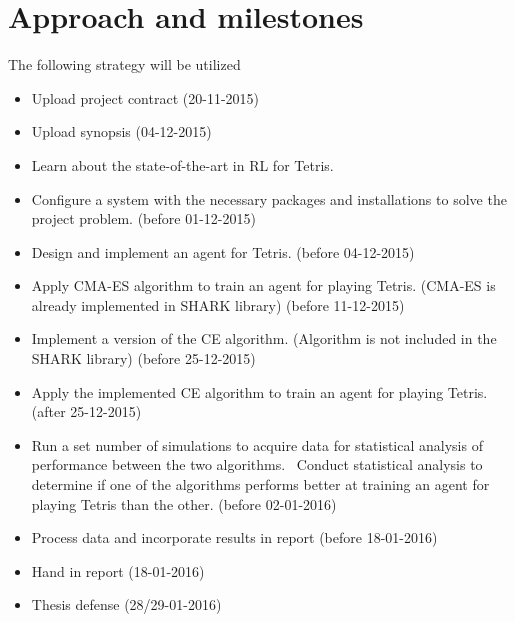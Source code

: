 \section*{Approach and milestones}
The following strategy will be utilized
\begin{itemize}
\item Upload project contract (20-11-2015)
\item Upload synopsis (04-12-2015)
\item Learn about the state-of-the-art in RL for Tetris.
\item Configure a system with the necessary packages and installations to solve the project problem. (before 01-12-2015)
\item Design and implement an agent for Tetris. (before 04-12-2015)
\item Apply CMA-ES algorithm to train an agent for playing Tetris. (CMA-ES is already implemented in SHARK library)
 (before 11-12-2015)
\item Implement a version of the CE algorithm. (Algorithm is not included in the SHARK library) (before 25-12-2015)
\item Apply the implemented CE algorithm to train an agent for playing Tetris. (after 25-12-2015)
\item Run a set number of simulations to acquire data for statistical analysis of performance between the two algorithms.
\ Conduct statistical analysis to determine if one of the algorithms performs better at training an agent for playing Tetris than the other. (before 02-01-2016)
\item Process data and incorporate results in report (before 18-01-2016)
\item Hand in report (18-01-2016)
\item Thesis defense (28/29-01-2016)
\end{itemize}